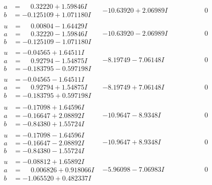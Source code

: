 \documentclass[1p]{elsarticle_modified}
\theoremstyle{definition}
\begin{document}
$$\begin{array}{c|c|c}
\begin{aligned}
a &= \phantom{-}0.32220 + 1.59846 I \\
b &= -0.125109 + 1.071180 I\end{aligned}
 & -10.63920 + 2.06989 I & \phantom{-0.000000 } 0 \\ \hline\begin{aligned}
u &= \phantom{-}0.00804 - 1.64429 I \\
a &= \phantom{-}0.32220 - 1.59846 I \\
b &= -0.125109 - 1.071180 I\end{aligned}
 & -10.63920 - 2.06989 I & \phantom{-0.000000 } 0 \\ \hline\begin{aligned}
u &= -0.04565 + 1.64511 I \\
a &= \phantom{-}0.92794 - 1.54875 I \\
b &= -0.183795 - 0.597198 I\end{aligned}
 & -8.19749 - 7.06148 I & \phantom{-0.000000 } 0 \\ \hline\begin{aligned}
u &= -0.04565 - 1.64511 I \\
a &= \phantom{-}0.92794 + 1.54875 I \\
b &= -0.183795 + 0.597198 I\end{aligned}
 & -8.19749 + 7.06148 I & \phantom{-0.000000 } 0 \\ \hline\begin{aligned}
u &= -0.17098 + 1.64596 I \\
a &= -0.16647 + 2.08892 I \\
b &= -0.84380 + 1.55724 I\end{aligned}
 & -10.9647 - 8.9348 I & \phantom{-0.000000 } 0 \\ \hline\begin{aligned}
u &= -0.17098 - 1.64596 I \\
a &= -0.16647 - 2.08892 I \\
b &= -0.84380 - 1.55724 I\end{aligned}
 & -10.9647 + 8.9348 I & \phantom{-0.000000 } 0 \\ \hline\begin{aligned}
u &= -0.08812 + 1.65892 I \\
a &= \phantom{-}0.006826 + 0.918066 I \\
b &= -1.065520 + 0.482337 I\end{aligned}
 & -5.96098 - 7.06983 I & \phantom{-0.000000 } 0 \\ \hline\begin{aligned}

\end{aligned}
\end{array}$$
\end{document}
